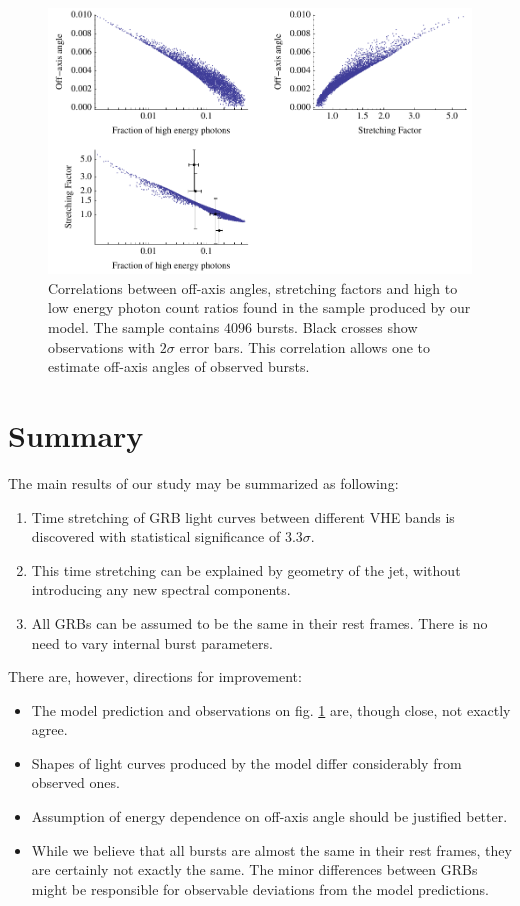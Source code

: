 \documentclass{article}
\begin{document}
\begin{figure}
        \centering
        \includegraphics[width=1.0\textwidth]{correlations}
        \caption{Correlations between off-axis angles, stretching factors and high to low energy photon count ratios found in the sample produced by our model. The sample contains $4096$ bursts. Black crosses show observations with $2\sigma$ error bars. This correlation allows one to estimate off-axis angles of observed bursts.}
        \label{fig:correlations}
\end{figure}

\section{Summary}

\label{sec:summary}

	The main results of our study may be summarized as following:
	\begin{enumerate}
		\item{
			Time stretching of GRB light curves between different VHE bands is discovered with statistical significance of $3.3\sigma$.
		}
		\item{
			This time stretching can be explained by geometry of the jet, without introducing any new spectral components.
		}
		\item{
			All GRBs can be assumed to be the same in their rest frames.
			There is no need to vary internal burst parameters.
		}
	\end{enumerate}

	There are, however, directions for improvement:
	\begin{itemize}
		\item{
			The model prediction and observations on fig. \ref{fig:correlations} are, though close, not exactly agree.
		}
		\item{
			Shapes of light curves produced by the model differ considerably from observed ones.
		}
		\item{
			Assumption of energy dependence on off-axis angle should be justified better.
		}
		\item{
			While we believe that all bursts are almost the same in their rest frames, they are certainly not exactly the same.
			The minor differences between GRBs might be responsible for observable deviations from the model predictions.
		}
	\end{itemize}
\end{document}
